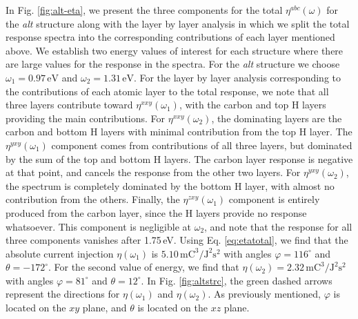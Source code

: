 \documentclass[pss]{wiley2sp} %
\begin{document}
In Fig. \ref{fig:alt-eta}, we present the three components for the total
$\eta^{abc}(\omega)$ for the 
\emph{alt} structure along with the layer by layer analysis in which we split
the total response spectra into the corresponding contributions of each layer
mentioned above. We establish two energy values of interest for each structure
where there are large values for the response in the spectra. For the
\emph{alt} structure we choose $\omega_{1} = 0.97\,\mathrm{eV}$ and $\omega_{2} =
1.31\,\mathrm{eV}$. For the layer by layer analysis corresponding to the
contributions of each atomic layer to the total response, we note that all
three layers contribute toward $\eta^{xxy}(\omega_{1})$, with the carbon
and top H layers providing the main contributions. For $\eta^{xxy}(\omega_{2})$, the
dominating layers are the carbon and bottom H layers with minimal contribution
from the top H layer. The $\eta^{yxy}(\omega_{1})$ component comes from 
contributions of all three layers, but dominated by the sum of the
top and bottom H layers. The carbon layer response is negative at that point,
and cancels the response from the other two layers. For
$\eta^{yxy}(\omega_{2})$, the spectrum is completely dominated by the bottom H layer, with
almost no contribution from the others. Finally, the
$\eta^{zxy}(\omega_{1})$ component is entirely produced from the carbon layer,
since the H layers provide no response whatsoever. This component is negligible
at $\omega_{2}$, and note that the response for all three components vanishes after
1.75\,eV. Using Eq. \eqref{eq:etatotal}, we find that the absolute current
injection $\eta(\omega_{1})$ is
$5.10\,\mathrm{mC}^{3}/\mathrm{J}^{2}\mathrm{s}^{2}$ with angles
$\varphi=116^{\circ}$ and $\theta=-172^{\circ}$. For the second value of energy, we find that
$\eta(\omega_{2})=2.32\,\mathrm{mC}^{3}/\mathrm{J}^{2}\mathrm{s}^{2}$ with angles
$\varphi=81^{\circ}$ and $\theta=12^{\circ}$. In Fig.
\ref{fig:altstrc}, the green dashed arrows represent the directions for
$\eta(\omega_{1})$ and $\eta(\omega_{2})$. As previously mentioned, 
$\varphi$ is located on the $xy$ plane, and $\theta$ is located on
the $xz$ plane.
\end{document}
